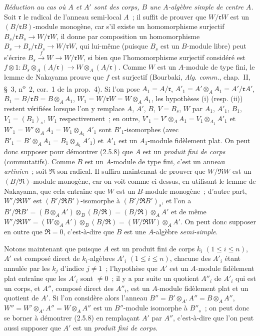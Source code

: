 \begin{env}[2.5.8.8]
\label{IV.2.5.8.8-fr}
\emph{Réduction au cas où $A$ et $A'$ sont des corps, $B$ une $A$-algèbre
simple de centre $A$.} Soit $\mathfrak r$ le radical de l'anneau semi-local
$A$~; il suffit de prouver que $W/\mathfrak rW$ est un
$(B/\mathfrak rB)$-module monogène, car s'il existe un homomorphisme surjectif
$B_s/\mathfrak rB_s\to W/\mathfrak rW$, il donne par composition un
homomorphisme $B_s\to B_s/\mathfrak rB_s\to W/\mathfrak rW$, qui lui-même
(puisque $B_s$ est un $B$-module libre) peut s'écrire
$B_s\xrightarrow{f}W\to W/\mathfrak rW$, si bien que l'homomorphisme
surjectif considéré est $f\otimes1:B_s\otimes_A(A/\mathfrak r)\longrightarrow W\otimes_A(A/\mathfrak r)$. Comme $W$ est un $A$-module de type fini, le lemme de Nakayama prouve que
$f$ est surjectif (Bourbaki, \emph{Alg. comm.}, chap.~II, \S~3,
n\textsuperscript{o}~2, cor.~1 de la prop.~4). Si l'on pose $A_1=A/\mathfrak r$, $A'_1=A'\otimes_A A_1=A'/\mathfrak rA'$, $B_1=B/\mathfrak rB=B\otimes_A A_1$, $W_1=W/\mathfrak rW=W\otimes_A A_1$, les hypothèses (i) (resp. (ii)) restent vérifiées lorsque l'on y remplace
$A$, $A'$, $B$, $V=B_s$, $W$ par $A_1$, $A'_1$, $B_1$,
$V_1=(B_1)_s$, $W_1$ respectivement~; en outre,
$V'_1=V'\otimes_A A_1=V_1\otimes_{A_1}A'_1$ et
$W'_1=W'\otimes_A A_1=W_1\otimes_{A_1}A'_1$ sont $B'_1$-isomorphes (avec
$B'_1=B'\otimes_A A_1=B_1\otimes_{A_1}A'_1$) et $A'_1$ est un $A_1$-module
fidèlement plat. On peut donc supposer pour démontrer (2.5.8) que $A$ est un
\emph{produit fini de corps} (commutatifs). Comme $B$ est un $A$-module de
type fini, c'est un anneau \emph{artinien}~; soit $\mathfrak R$ son radical. Il
suffira maintenant de prouver que $W/\mathfrak RW$ est un
$(B/\mathfrak R)$-module monogène, car on voit comme ci-dessus, en utilisant
le lemme de Nakayama, que cela entraîne que $W$ est un $B$-module monogène~;
d'autre part, $W'/\mathfrak RW'$ est $(B'/\mathfrak RB')$-isomorphe à
$(B'/\mathfrak RB')_s$, et l'on a $B'/\mathfrak RB'=(B\otimes_A A')\otimes_B(B/\mathfrak R)=(B/\mathfrak R)\otimes_A A'$ et de même $W'/\mathfrak RW'=(W\otimes_A A')\otimes_B(B/\mathfrak R)=(W/\mathfrak RW)\otimes_A A'$. On peut donc supposer en outre que $\mathfrak R=0$, c'est-à-dire que $B$ est
une $A$-algèbre \emph{semi-simple}.

Notons maintenant que puisque $A$ est un produit fini de corps $k_i$
$(1\leq i\leq n)$, $A'$ est composé direct de $k_i$-algèbres $A'_i$
$(1\leq i\leq n)$, chacune des $A'_i$ étant annulée par les $k_j$ d'indice
$j\ne1$~; l'hypothèse que $A'$ est un $A$-module fidèlement plat entraîne
que les $A'_i$ sont $\ne0$~; il y a par suite un quotient $A''_i$ de $A'_i$
qui est un corps, et $A''$, composé direct des $A''_i$, est un $A$-module
fidèlement plat et un quotient de $A'$. Si l'on considère alors l'anneau
$B''=B'\otimes_{A'}A''=B\otimes_A A''$,
$W''=W'\otimes_{A'}A''=W\otimes_A A''$ est un $B''$-module isomorphe à
$B''_s$~; on peut donc se borner à démontrer (2.5.8) en remplaçant $A'$ par
$A''$, c'est-à-dire que l'on peut aussi supposer que $A'$ est un \emph{produit
fini de corps}.


\end{env}
